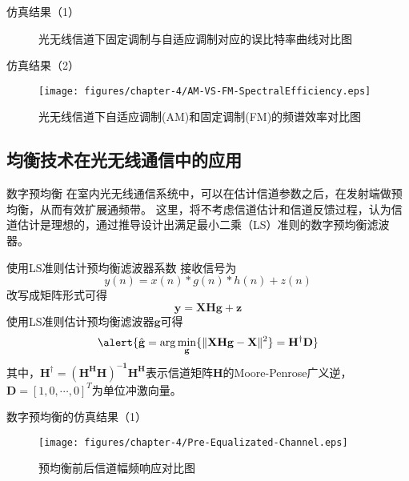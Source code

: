 \documentclass[mathserif, utf8, 9pt]{beamer}
\begin{document}
\begin{frame}{仿真结果（1）}
    \begin{figure}[htbp]
        \centering
        \caption{光无线信道下固定调制与自适应调制对应的误比特率曲线对比图}
    \end{figure}
\end{frame}

\begin{frame}{仿真结果（2）}
    \begin{figure}[htbp]
        \centering
    	\texttt{[image: figures/chapter-4/AM-VS-FM-SpectralEfficiency.eps]}
    	\caption{光无线信道下自适应调制(AM)和固定调制(FM)的频谱效率对比图}
    \end{figure}
\end{frame}

\subsection{均衡技术在光无线通信中的应用}
\begin{frame}{数字预均衡}
在室内光无线通信系统中，可以在估计信道参数之后，在发射端做预均衡，从而有效扩展通频带。
这里，将不考虑信道估计和信道反馈过程，认为信道估计是理想的，通过推导设计出满足最小二乘（LS）准则的数字预均衡滤波器。
\pause
\begin{block}{使用LS准则估计预均衡滤波器系数}
接收信号为
\begin{equation}
    y(n) = x(n) * g(n) * h(n) + z(n)
\end{equation}
改写成矩阵形式可得
\begin{equation}
    \mathbf{y} = \mathbf{XHg} + \mathbf{z}
\end{equation}
使用LS准则估计预均衡滤波器$\mathbf{g}$可得
\begin{equation}
    \alert{\hat{\mathbf{g}} = \arg\underset{\mathbf{g}}{\min}\{\|\mathbf{XHg - X}\|^2\} = \mathbf{H^\dag D}}
\end{equation}
其中，$\mathbf{H^\dag = (H^HH)^{-1}H^H}$表示信道矩阵$\mathbf{H}$的Moore-Penrose广义逆，$\mathbf{D}=[1,0,\cdots,0]^T$为单位冲激向量。
\end{block}
\end{frame}

\begin{frame}{数字预均衡的仿真结果（1）}
    \begin{figure}[htbp]
        \centering
    	\texttt{[image: figures/chapter-4/Pre-Equalizated-Channel.eps]}
    	\caption{预均衡前后信道幅频响应对比图}
    \end{figure}
\end{frame}
\end{document}
